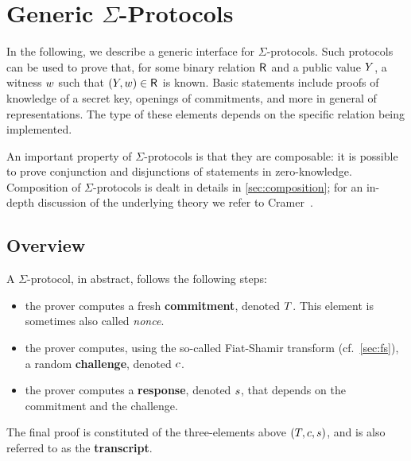 \documentclass[11pt]{article}
\begin{document}
\section{Generic $\Sigma$-Protocols}
In the following, we describe a generic interface for $\Sigma$-protocols.
Such protocols can be used to prove that, for some binary relation ${\mathsf{R}_{\operatorname{{}}}}$ and a public value $Y$, a witness $w$ such that $(Y,w)\in{\mathsf{R}_{\operatorname{{}}}}$ is known.
Basic statements include proofs of knowledge of a secret key, openings of commitments, and more in general of representations.
The type of these elements depends on the specific relation being implemented.

An important property of $\Sigma$-protocols is that they are composable: it is possible to prove conjunction and disjunctions of statements in zero-knowledge.
Composition of $\Sigma$-protocols is dealt in details in \cref{sec:composition}; for an in-depth discussion of the underlying theory we refer to Cramer~\cite{cramer97}.



\subsection{Overview}
A $\Sigma$-protocol, in abstract, follows the following steps:
\begin{itemize}
  \item the prover computes a fresh \textbf{commitment}, denoted $T$. This element is sometimes also called \emph{nonce}.
  \item the prover computes, using the so-called Fiat-Shamir transform (cf.~\cref{sec:fs}), a random \textbf{challenge}, denoted $c$.
  \item the prover computes a \textbf{response}, denoted $s$, that depends on the commitment and the challenge.
\end{itemize}
The final proof is constituted of the three-elements above $(T, c, s)$, and is also referred to as the \textbf{transcript}.
\end{document}

